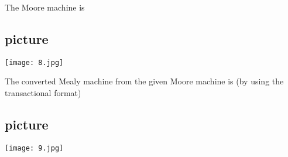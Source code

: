 \documentclass[9pt]{beamer}
\begin{document}
\begin{frame}
The Moore machine is\\
\begin{center}
\section{picture}
\texttt{[image: 8.jpg]}
\end{center}

The converted Mealy machine from the given Moore machine is (by using the transactional format)\\
\begin{center}
\section{picture}
\texttt{[image: 9.jpg]}
\end{center}
\end{frame}
\end{document}
